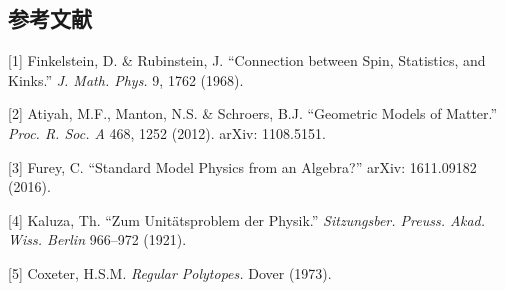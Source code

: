 \documentclass[a4paper,11pt]{ltjsarticle}
\begin{document}
\subsection*{参考文献}

{[}1{]} Finkelstein, D. \& Rubinstein, J. ``Connection between Spin,
Statistics, and Kinks.'' \emph{J. Math. Phys.} 9, 1762 (1968).

{[}2{]} Atiyah, M.F., Manton, N.S. \& Schroers, B.J. ``Geometric Models
of Matter.'' \emph{Proc. R. Soc. A} 468, 1252 (2012). arXiv: 1108.5151.

{[}3{]} Furey, C. ``Standard Model Physics from an Algebra?'' arXiv:
1611.09182 (2016).

{[}4{]} Kaluza, Th. ``Zum Unitätsproblem der Physik.''
\emph{Sitzungsber. Preuss. Akad. Wiss. Berlin} 966--972 (1921).

{[}5{]} Coxeter, H.S.M. \emph{Regular Polytopes.} Dover (1973).
\end{document}
